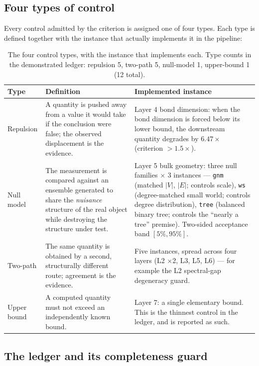 \documentclass[11pt,a4paper]{article}
\newcommand{\code}[1]{\texttt{\small #1}}
\begin{document}
\subsection{Four types of control}
\label{sec:taxonomy}

Every control admitted by the criterion is assigned one of four types. Each type is
defined together with the instance that actually implements it in the pipeline:

\begin{table}[h]
\centering\small
\begin{tabular}{@{}p{2.1cm}p{5.6cm}p{7.2cm}@{}}
\toprule
\textbf{Type} & \textbf{Definition} & \textbf{Implemented instance} \\
\midrule
Repulsion &
A quantity is pushed away from a value it would take if the conclusion were false;
the observed displacement is the evidence. &
Layer 4 bond dimension: when the bond dimension is forced below its lower bound,
the downstream quantity degrades by $6.47\times$ (criterion $>1.5\times$). \\[3pt]
Null model &
The measurement is compared against an ensemble generated to share the
\emph{nuisance} structure of the real object while destroying the structure under
test. &
Layer 5 bulk geometry: three null families $\times$ 3 instances --- \code{gnm}
(matched $|V|$, $|E|$; controls scale), \code{ws} (degree-matched small world;
controls degree distribution), \code{tree} (balanced binary tree; controls the
``nearly a tree'' premise). Two-sided acceptance band $[5\%,95\%]$. \\[3pt]
Two-path &
The same quantity is obtained by a second, structurally different route; agreement
is the evidence. &
Five instances, spread across four layers (L2 $\times$2, L3, L5, L6) --- for example
the L2 spectral-gap degeneracy guard. \\[3pt]
Upper bound &
A computed quantity must not exceed an independently known bound. &
Layer 7: a single elementary bound. This is the thinnest control in the ledger, and
is reported as such. \\
\bottomrule
\end{tabular}
\caption{The four control types, with the instance that implements each. Type
counts in the demonstrated ledger: repulsion 5, two-path 5, null-model 1,
upper-bound 1 (12 total).}
\label{tab:types}
\end{table}

\subsection{The ledger and its completeness guard}
\label{sec:ledger}
\end{document}
